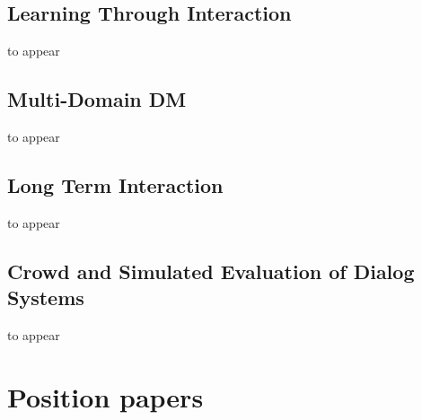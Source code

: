 \documentclass[12pt]{article}
\begin{document}
\subsection{Learning Through Interaction}
to appear
\subsection{Multi-Domain DM}
to appear
\subsection{Long Term Interaction}
to appear
\subsection{Crowd and Simulated Evaluation of Dialog Systems}
to appear
 

\section{Position papers}
\end{document}
